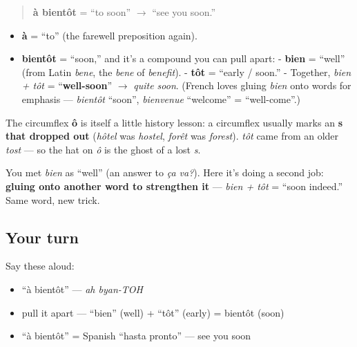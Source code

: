 \begin{cousinweb}
\begin{quote}
\textbf{à bientôt} = \textquotedblleft{}to soon\textquotedblright{} $\to$ \textquotedblleft{}see you soon.\textquotedblright{}
\end{quote}

\begin{itemize}
\raggedright
  \item \textbf{à} = \textquotedblleft{}to\textquotedblright{} (the farewell preposition again).
  \item \textbf{bientôt} = \textquotedblleft{}soon,\textquotedblright{} and it's a compound you can pull apart: - \textbf{bien} = \textquotedblleft{}well\textquotedblright{} (from Latin \emph{bene}, the \emph{bene} of \emph{benefit}). - \textbf{tôt} = \textquotedblleft{}early / soon.\textquotedblright{} - Together, \emph{bien + tôt} = \textquotedblleft{}\textbf{well-soon}\textquotedblright{} $\to$ \emph{quite soon}. (French loves gluing \emph{bien} onto words for emphasis — \emph{bientôt} \textquotedblleft{}soon\textquotedblright{}, \emph{bienvenue} \textquotedblleft{}welcome\textquotedblright{} = \textquotedblleft{}well-come\textquotedblright{}.)
\end{itemize}

The circumflex \textbf{ô} is itself a little history lesson: a circumflex usually marks an \textbf{s that dropped out} (\emph{hôtel} was \emph{hostel}, \emph{forêt} was \emph{forest}). \emph{tôt} came from an older \emph{tost} — so the hat on \emph{ô} is the ghost of a lost \emph{s}.
\end{cousinweb}

\begin{grammarlens}[title={Grammar Lens: bien, the intensifier}]
You met \emph{bien} as \textquotedblleft{}well\textquotedblright{} (an answer to \emph{ça va?}). Here it's doing a second job: \textbf{gluing onto another word to strengthen it} — \emph{bien + tôt} = \textquotedblleft{}soon indeed.\textquotedblright{} Same word, new trick.
\end{grammarlens}

\subsection*{Your turn}
Say these aloud:

\begin{itemize}
\raggedright
  \item \textquotedblleft{}à bientôt\textquotedblright{} — \emph{ah byan-TOH}
  \item pull it apart — \textquotedblleft{}bien\textquotedblright{} (well) + \textquotedblleft{}tôt\textquotedblright{} (early) = bientôt (soon)
  \item \textquotedblleft{}à bientôt\textquotedblright{} = Spanish \textquotedblleft{}hasta pronto\textquotedblright{} — see you soon
\end{itemize}

